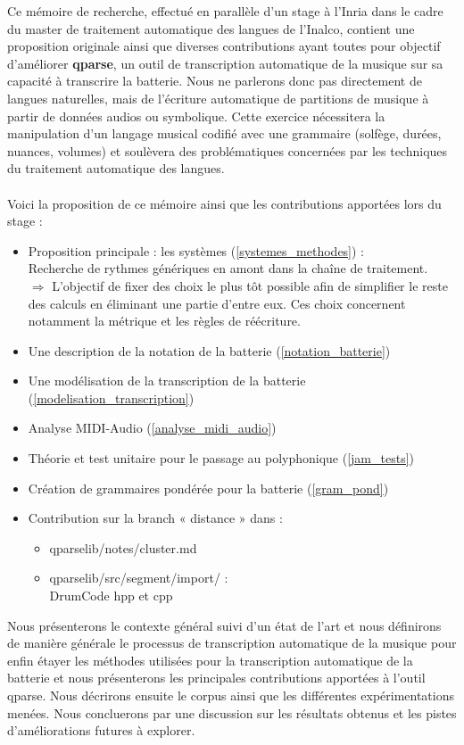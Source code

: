 Ce mémoire de recherche, effectué en parallèle d’un stage à l’Inria dans le cadre du master de traitement automatique des langues de l’Inalco, contient une proposition originale ainsi que diverses contributions ayant toutes pour objectif d’améliorer \textbf{qparse}, un outil de transcription automatique de la musique sur sa capacité à transcrire la batterie. Nous ne parlerons donc pas directement de langues naturelles, mais de l’écriture automatique de partitions de musique à partir de données audios ou symbolique. Cette exercice nécessitera la manipulation d’un langage musical codifié avec une grammaire (solfège, durées, nuances, volumes) et soulèvera des problématiques concernées par les techniques du traitement automatique des langues.\\\\
Voici la proposition de ce mémoire ainsi que les contributions apportées lors du stage :
\begin{itemize}
	\item Proposition principale : les systèmes (\ref{systemes_methodes}) :\\
	Recherche de rythmes génériques en amont dans la chaîne de traitement.\\
	$\Rightarrow$ L’objectif de fixer des choix le plus tôt possible afin de simplifier le reste des calculs en éliminant une partie d’entre eux. Ces choix concernent notamment la métrique et les règles de réécriture.
	\item Une description de la notation de la batterie (\ref{notation_batterie})
	\item Une modélisation de la transcription de la batterie (\ref{modelisation_transcription})
	\item Analyse MIDI-Audio (\ref{analyse_midi_audio})
	\item Théorie et test unitaire pour le passage au polyphonique (\ref{jam_tests})
	\item Création de grammaires pondérée pour la batterie (\ref{gram_pond})
	\item Contribution sur la branch « distance » dans :
	\begin{itemize}
		\item qparselib/notes/cluster.md
		\item qparselib/src/segment/import/ :\\
		DrumCode hpp et cpp\\
	\end{itemize}
\end{itemize}
 
Nous présenterons le contexte général suivi d’un état de l’art et nous définirons de manière générale le processus de transcription automatique de la musique pour enfin étayer les méthodes utilisées pour la transcription automatique de la batterie et nous présenterons les principales contributions apportées à l’outil qparse. Nous décrirons ensuite le corpus ainsi que les différentes expérimentations menées. Nous concluerons par une discussion sur les résultats obtenus et les pistes d’améliorations futures à explorer.